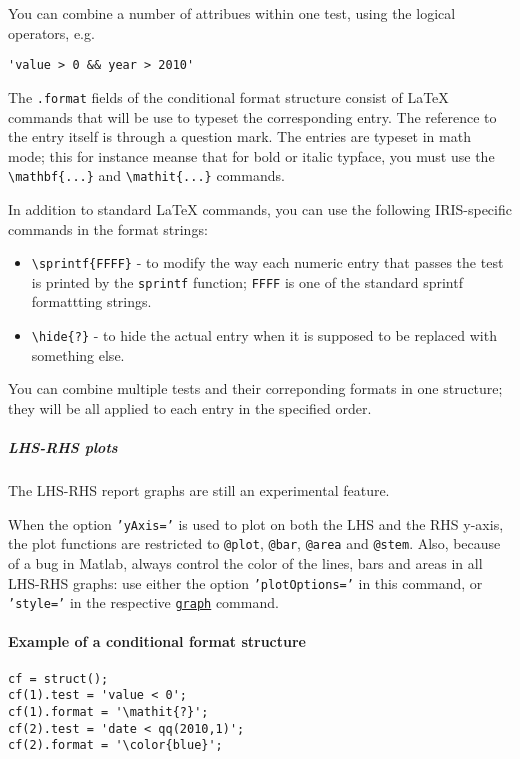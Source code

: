 You can combine a number of attribues within one test, using the logical
operators, e.g.

\begin{verbatim}
'value > 0 && year > 2010'
\end{verbatim}

The \texttt{.format} fields of the conditional format structure consist
of LaTeX commands that will be use to typeset the corresponding entry.
The reference to the entry itself is through a question mark. The
entries are typeset in math mode; this for instance meanse that for bold
or italic typface, you must use the
\texttt{\textbackslash{}mathbf\{...\}} and
\texttt{\textbackslash{}mathit\{...\}} commands.

In addition to standard LaTeX commands, you can use the following
IRIS-specific commands in the format strings:

\begin{itemize}
\item
  \texttt{\textbackslash{}sprintf\{FFFF\}} - to modify the way each
  numeric entry that passes the test is printed by the \texttt{sprintf}
  function; \texttt{FFFF} is one of the standard sprintf formattting
  strings.
\item
  \texttt{\textbackslash{}hide\{?\}} - to hide the actual entry when it
  is supposed to be replaced with something else.
\end{itemize}

You can combine multiple tests and their correponding formats in one
structure; they will be all applied to each entry in the specified
order.

\subparagraph{LHS-RHS plots}\label{lhs-rhs-plots}

The LHS-RHS report graphs are still an experimental feature.

When the option \texttt{'yAxis='} is used to plot on both the LHS and
the RHS y-axis, the plot functions are restricted to \texttt{@plot},
\texttt{@bar}, \texttt{@area} and \texttt{@stem}. Also, because of a bug
in Matlab, always control the color of the lines, bars and areas in all
LHS-RHS graphs: use either the option \texttt{'plotOptions='} in this
command, or \texttt{'style='} in the respective
\href{report/graph}{\texttt{graph}} command.

\paragraph{Example of a conditional format
structure}\label{example-of-a-conditional-format-structure}

\begin{verbatim}
cf = struct();
cf(1).test = 'value < 0';
cf(1).format = '\mathit{?}';
cf(2).test = 'date < qq(2010,1)';
cf(2).format = '\color{blue}';
\end{verbatim}


